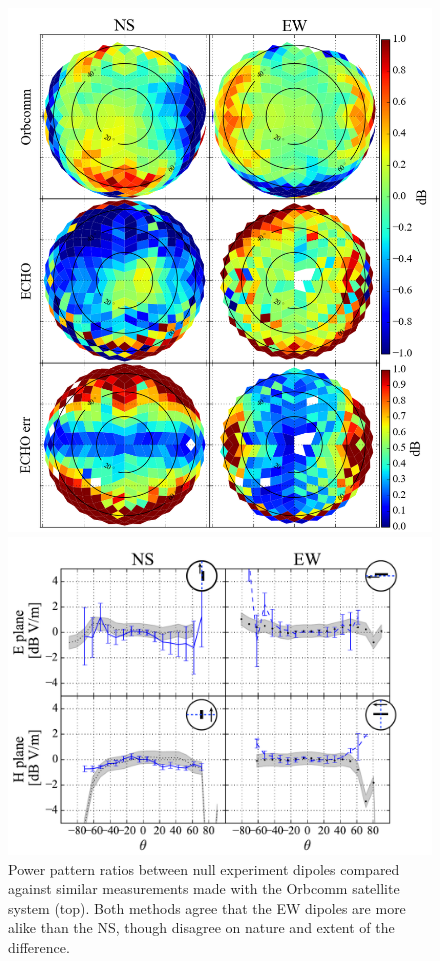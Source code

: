 \documentclass[preprint2,numberedappendix,tighten,twocolappendix]{aastex6}
\begin{document}
\begin{figure}
\begin{minipage}{0.45\textwidth}
\centering
\includegraphics[width=\textwidth]{figures/GB_OC_ratio_compare.png}
\caption{Power pattern ratios between null experiment dipoles compared against similar measurements made with the Orbcomm satellite system (top).  Both methods agree that the EW dipoles are more alike than the NS, though disagree on nature and extent of the difference.}\label{fig:GB_ratio_maps}
\end{minipage}
\centering
\begin{minipage}{0.45\textwidth}
\centering
\includegraphics[width=\columnwidth]{figures/GB_ratio_slice_5dB.pdf}

\end{minipage}
\end{figure}
\end{document}
